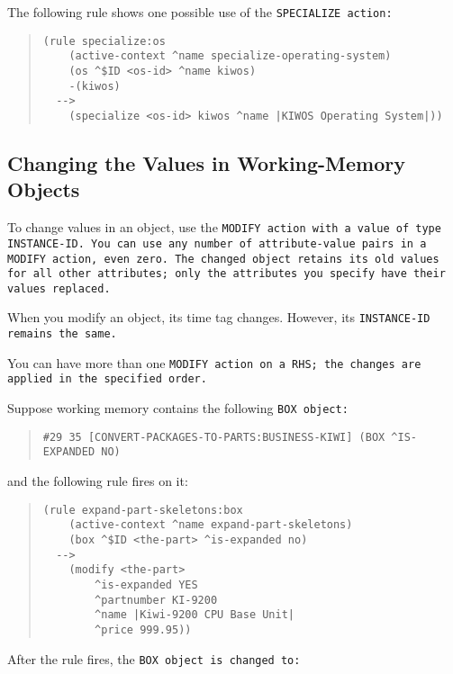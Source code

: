 The following rule shows one possible use of the \tt{SPECIALIZE}
action:

\begin{quote}
\begin{verbatim}
(rule specialize:os
    (active-context ^name specialize-operating-system)
    (os ^$ID <os-id> ^name kiwos)
    -(kiwos)
  -->
    (specialize <os-id> kiwos ^name |KIWOS Operating System|))
\end{verbatim}
\end{quote}

\subsection{Changing the Values in Working-Memory Objects}

To change values in an object, use the \tt{MODIFY} action with a value
of type \tt{INSTANCE-ID}. You can use any number of attribute-value
pairs in a \tt{MODIFY} action, even zero. The changed object retains
its old values for all other attributes; only the attributes you
specify have their values replaced.

\begin{note}
  When you modify an object, its time tag changes. However, its
  \tt{INSTANCE-ID} remains the same.
\end{note}

You can have more than one \tt{MODIFY} action on a RHS; the changes
are applied in the specified order.

Suppose working memory contains the following \tt{BOX} object:

\begin{quote}
\begin{verbatim}
#29 35 [CONVERT-PACKAGES-TO-PARTS:BUSINESS-KIWI] (BOX ^IS-EXPANDED NO)
\end{verbatim}
\end{quote}
and the following rule fires on it:
\begin{quote}
\begin{verbatim}
(rule expand-part-skeletons:box
    (active-context ^name expand-part-skeletons)
    (box ^$ID <the-part> ^is-expanded no)
  -->
    (modify <the-part>
        ^is-expanded YES
        ^partnumber KI-9200
        ^name |Kiwi-9200 CPU Base Unit|
        ^price 999.95))
\end{verbatim}
\end{quote}

After the rule fires, the \tt{BOX} object is changed to:

